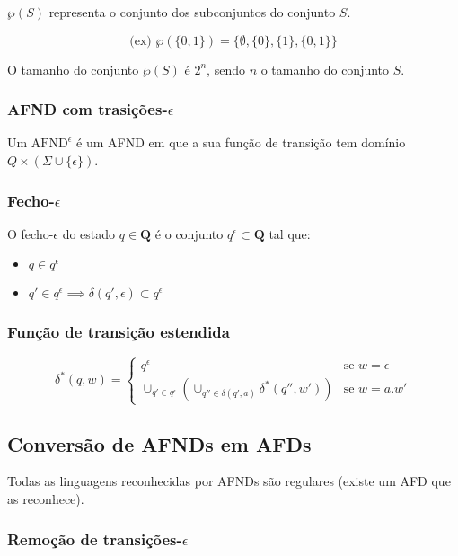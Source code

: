 \documentclass{article}
\begin{document}
$\wp(S)$ representa o conjunto dos subconjuntos do conjunto $S$.

$$ \text{(ex) } \wp(\{0,1\}) = \{\emptyset, \{0\}, \{1\}, \{0,1\}\} $$

\noindent O tamanho do conjunto $\wp(S)$ é $2^n$, sendo $n$ o tamanho do conjunto $S$.

\subsubsection{AFND com trasições-$\epsilon$}

Um $\text{AFND}^\epsilon$ é um AFND em que a sua função de transição tem domínio $Q \times (\Sigma \cup \{\epsilon\})$.

\subsubsection{Fecho-$\epsilon$}

O fecho-$\epsilon$ do estado $q \in \mathbf{Q}$ é o conjunto $q^\epsilon \subset \mathbf{Q}$ tal que:

\begin{itemize}
    \item $q \in q^\epsilon$
    \item $q' \in q^\epsilon \implies \delta(q', \epsilon) \subset q^\epsilon$
\end{itemize}

\subsubsection{Função de transição estendida}

$$ \delta^*(q, w) = \begin{cases}
        q^\epsilon                                                              & \text{se } w = \epsilon \\
        \cup_{q' \in q^\epsilon}(\cup_{q'' \in \delta(q', a)}\delta^*(q'', w')) & \text{se } w = a.w'
    \end{cases} $$

\subsection{Conversão de AFNDs em AFDs}

Todas as linguagens reconhecidas por AFNDs são regulares (existe um AFD que as reconhece).

\subsubsection{Remoção de transições-$\epsilon$}
\end{document}
